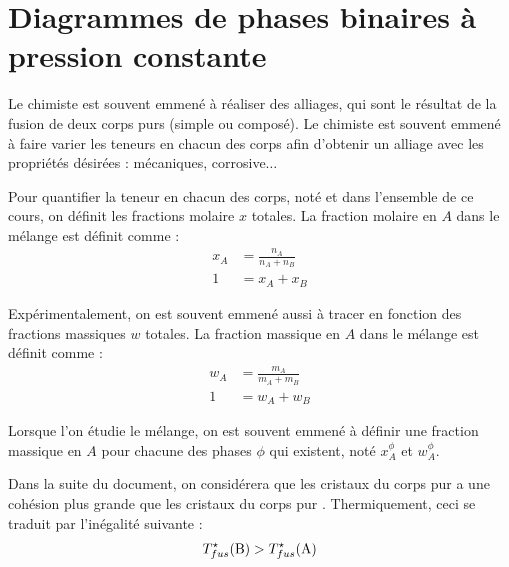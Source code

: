 \documentclass[a4paper,16pt]{book}
\begin{document}

\tableofcontents

\setcounter{chapter}{1}
\chapter{Diagrammes de phases binaires à pression constante}

Le chimiste est souvent emmené à réaliser des alliages, qui sont le résultat de la fusion de deux corps purs (simple ou composé). Le chimiste est souvent emmené à faire varier les teneurs en chacun des corps afin d'obtenir un alliage avec les propriétés désirées : mécaniques, corrosive$\ldots$

Pour quantifier la teneur en chacun des corps, noté  et  dans l'ensemble de ce cours, on définit les fractions molaire $x$ totales. La fraction molaire en $A$ dans le mélange est définit comme : 
\begin{align*}
x_A &= \frac{n_A}{n_A + n_B} \\
1 &= x_A + x_B
\end{align*}

Expérimentalement, on est souvent emmené aussi à tracer en fonction des fractions massiques $w$ totales. La fraction massique en $A$ dans le mélange est définit comme : 
\begin{align*}
w_A &= \frac{m_A}{m_A + m_B} \\
1 &= w_A + w_B
\end{align*}

Lorsque l'on étudie le mélange, on est souvent emmené à définir une fraction massique en $A$ pour chacune des phases $\phi$ qui existent, noté $x_A^\phi$ et $w_A^\phi$.

Dans la suite du document, on considérera que les cristaux du corps pur  a une cohésion plus grande que les cristaux du corps pur . Thermiquement, ceci se traduit par l'inégalité suivante :
\begin{align*}
T^\star_{fus} (\ce{B}) > T^\star_{fus} (\ce{A})
\end{align*}
\end{document}
